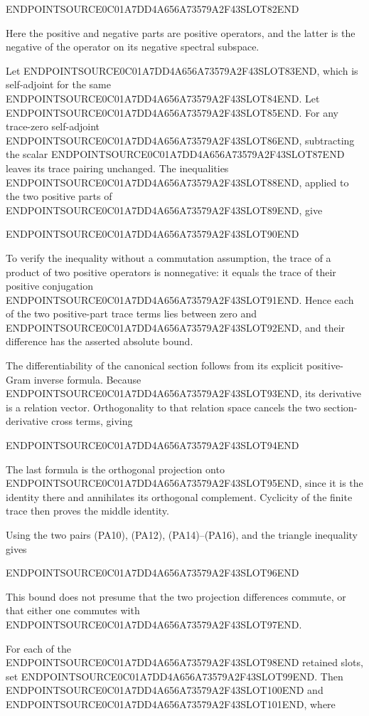 ENDPOINTSOURCE0C01A7DD4A656A73579A2F43SLOT82END

Here the positive and negative parts are positive operators, and the latter is the negative of the operator on its negative spectral subspace.

Let ENDPOINTSOURCE0C01A7DD4A656A73579A2F43SLOT83END, which is self-adjoint for the same ENDPOINTSOURCE0C01A7DD4A656A73579A2F43SLOT84END. Let ENDPOINTSOURCE0C01A7DD4A656A73579A2F43SLOT85END. For any trace-zero self-adjoint ENDPOINTSOURCE0C01A7DD4A656A73579A2F43SLOT86END, subtracting the scalar ENDPOINTSOURCE0C01A7DD4A656A73579A2F43SLOT87END leaves its trace pairing unchanged. The inequalities ENDPOINTSOURCE0C01A7DD4A656A73579A2F43SLOT88END, applied to the two positive parts of ENDPOINTSOURCE0C01A7DD4A656A73579A2F43SLOT89END, give

ENDPOINTSOURCE0C01A7DD4A656A73579A2F43SLOT90END

To verify the inequality without a commutation assumption, the trace of a product of two positive operators is nonnegative: it equals the trace of their positive conjugation ENDPOINTSOURCE0C01A7DD4A656A73579A2F43SLOT91END. Hence each of the two positive-part trace terms lies between zero and ENDPOINTSOURCE0C01A7DD4A656A73579A2F43SLOT92END, and their difference has the asserted absolute bound.

The differentiability of the canonical section follows from its explicit positive-Gram inverse formula. Because ENDPOINTSOURCE0C01A7DD4A656A73579A2F43SLOT93END, its derivative is a relation vector. Orthogonality to that relation space cancels the two section-derivative cross terms, giving

ENDPOINTSOURCE0C01A7DD4A656A73579A2F43SLOT94END

The last formula is the orthogonal projection onto ENDPOINTSOURCE0C01A7DD4A656A73579A2F43SLOT95END, since it is the identity there and annihilates its orthogonal complement. Cyclicity of the finite trace then proves the middle identity.

Using the two pairs (PA10), (PA12), (PA14)--(PA16), and the triangle inequality gives

ENDPOINTSOURCE0C01A7DD4A656A73579A2F43SLOT96END

This bound does not presume that the two projection differences commute, or that either one commutes with ENDPOINTSOURCE0C01A7DD4A656A73579A2F43SLOT97END.

For each of the ENDPOINTSOURCE0C01A7DD4A656A73579A2F43SLOT98END retained slots, set ENDPOINTSOURCE0C01A7DD4A656A73579A2F43SLOT99END. Then ENDPOINTSOURCE0C01A7DD4A656A73579A2F43SLOT100END and ENDPOINTSOURCE0C01A7DD4A656A73579A2F43SLOT101END, where

